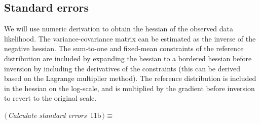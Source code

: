 \documentclass[reqno]{amsart}
\renewcommand{\NWtarget}[2]{\hypertarget{#1}{#2}}
\begin{document}
\subsection{Standard errors}

We will use numeric derivation to obtain the hessian of the observed data likelihood. The variance-covariance matrix can be estimated as the inverse of the negative hessian. The sum-to-one and fixed-mean constraints of the reference distribution are included by expanding the hessian to a bordered hessian before inversion by including the derivatives of the constraints (this can be derived based on the Lagrange multiplier method). The reference distribution is included in the hessian on the log-scale, and is multiplied by the gradient before inversion to revert to the original scale.

\begin{flushleft} \small\label{scrap13}\raggedright\small
\NWtarget{nuweb11b}{} $\langle\,${\itshape Calculate standard errors}\nobreak\ {\footnotesize {11b}}$\,\rangle\equiv$
\vspace{-1ex}
\end{flushleft}
\end{document}

